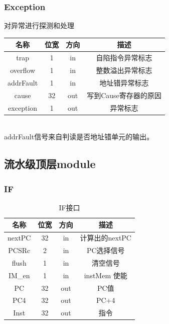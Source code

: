 \documentclass[UTF8]{ctexart}
\begin{document}
\subsubsection{Exception}
对异常进行探测和处理
\begin{table}[h]
    \centering
    \begin{tabular}{|c|c|c|c|}
        \hline  
        名称 & 位宽 & 方向 & 描述 \\ \hline
        trap & 1 & in & 自陷指令异常标志 \\ \hline
        overflow & 1 & in & 整数溢出异常标志 \\ \hline 
        addrFault & 1 & in & 地址错异常标志 \\ \hline     
        cause & 32 & out & 写到Cause寄存器的原因 \\ \hline 
        exception & 1 & out & 异常标志 \\ \hline
    \end{tabular}
    
\end{table}\\
addrFault信号来自判读是否地址错单元的输出。
\subsection{流水级顶层module}
\subsubsection{IF}
\begin{table}[h]
    \centering
    \begin{tabular}{|c|c|c|c|}
        \hline  
        名称 & 位宽 & 方向 & 描述 \\ \hline
        nextPC & 32 & in & 计算出的nextPC \\ \hline
        PCSRc & 2 & in & PC选择信号 \\ \hline
        flush & 1 & in & 清空信号 \\ \hline 
        IM\_en & 1 & in & instMem 使能 \\ \hline
        PC & 32 & out & PC值  \\ \hline
        PC4 & 32 & out & PC+4 \\ \hline 
        Inst & 32 & out & 指令 \\ \hline 
    \end{tabular}
    \caption{IF接口}
\end{table}
\end{document}
